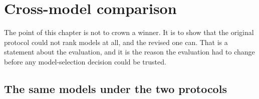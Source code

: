 \chapter{Cross-model comparison}
\label{ch:crossmodel}

\begin{saybox}[title=What to say at the start of this section]
The point of this chapter is not to crown a winner. It is to show that the
original protocol could not rank models at all, and the revised one can.
That is a statement about the evaluation, and it is the reason the
evaluation had to change before any model-selection decision could be
trusted.
\end{saybox}

\section{The same models under the two protocols}


